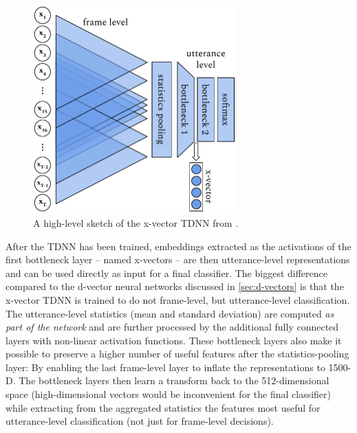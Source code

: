 \documentclass[bsc,frontabs,twoside,singlespacing,parskip,deptreport]{infthesis}
\begin{document}
{{    \begin{figure}[h!]
      \centering
      \includegraphics[height=8cm]{graphics/x-vectors-hl}
      \caption{A high-level sketch of the x-vector TDNN from \citeauthor{Snyder_et_al_2018}.}
      \label{fig:x-vectors-hl}
    \end{figure}
    After the TDNN has been trained, embeddings extracted as the activations of the first bottleneck layer -- named x-vectors -- are then utterance-level representations and can be used directly as input for a final classifier. The biggest difference compared to the d-vector neural networks discussed in \autoref{sec:d-vectors} is that the x-vector TDNN is trained to do not frame-level, but utterance-level classification. The utterance-level statistics (mean and standard deviation) are computed \textit{as part of the network} and are further processed by the additional fully connected layers with non-linear activation functions. These bottleneck layers also make it possible to preserve a higher number of useful features after the statistics-pooling layer: By enabling the last frame-level layer to inflate the representations to 1500-D. The bottleneck layers then learn a transform back to the 512-dimensional space (high-dimensional vectors would be inconvenient for the final classifier) while extracting from the aggregated statistics the features most useful for utterance-level classification (not just for frame-level decisions).

}}
\end{document}
